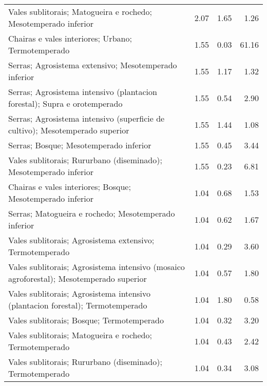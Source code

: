 \begin{table}[p]
\begin{tabular}{lrrr}
  Vales sublitorais; Matogueira e rochedo; Mesotemperado inferior & 2.07 & 1.65 & 1.26 \\ 
  Chairas e vales interiores; Urbano; Termotemperado & 1.55 & 0.03 & 61.16 \\ 
  Serras; Agrosistema extensivo; Mesotemperado inferior & 1.55 & 1.17 & 1.32 \\ 
  Serras; Agrosistema intensivo (plantacion forestal); Supra e orotemperado & 1.55 & 0.54 & 2.90 \\ 
  Serras; Agrosistema intensivo (superficie de cultivo); Mesotemperado superior & 1.55 & 1.44 & 1.08 \\ 
  Serras; Bosque; Mesotemperado inferior & 1.55 & 0.45 & 3.44 \\ 
  Vales sublitorais; Rururbano (diseminado); Mesotemperado inferior & 1.55 & 0.23 & 6.81 \\ 
  Chairas e vales interiores; Bosque; Mesotemperado inferior & 1.04 & 0.68 & 1.53 \\ 
  Serras; Matogueira e rochedo; Mesotemperado inferior & 1.04 & 0.62 & 1.67 \\ 
  Vales sublitorais; Agrosistema extensivo; Termotemperado & 1.04 & 0.29 & 3.60 \\ 
  Vales sublitorais; Agrosistema intensivo (mosaico agroforestal); Mesotemperado superior & 1.04 & 0.57 & 1.80 \\ 
  Vales sublitorais; Agrosistema intensivo (plantacion forestal); Termotemperado & 1.04 & 1.80 & 0.58 \\ 
  Vales sublitorais; Bosque; Termotemperado & 1.04 & 0.32 & 3.20 \\ 
  Vales sublitorais; Matogueira e rochedo; Termotemperado & 1.04 & 0.43 & 2.42 \\ 
  Vales sublitorais; Rururbano (diseminado); Termotemperado & 1.04 & 0.34 & 3.08 \\ 
   \hline
\end{tabular}
\end{table}
